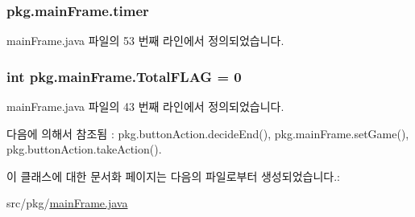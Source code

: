 \subsubsection[{\texorpdfstring{timer}{timer}}]{ pkg.\+main\+Frame.\+timer\hspace{0.3cm}{\ttfamily [private]}}\hypertarget{classpkg_1_1main_frame_aa204a940456c1c064259cafdd59434a6}{}\label{classpkg_1_1main_frame_aa204a940456c1c064259cafdd59434a6}


main\+Frame.\+java 파일의 53 번째 라인에서 정의되었습니다.

\subsubsection[{\texorpdfstring{Total\+F\+L\+AG}{TotalFLAG}}]{\setlength{\rightskip}{0pt plus 5cm}int pkg.\+main\+Frame.\+Total\+F\+L\+AG = 0\hspace{0.3cm}{\ttfamily [static]}}\hypertarget{classpkg_1_1main_frame_a05dfc088773f5e52294e2ca37cccbcf1}{}\label{classpkg_1_1main_frame_a05dfc088773f5e52294e2ca37cccbcf1}


main\+Frame.\+java 파일의 43 번째 라인에서 정의되었습니다.



다음에 의해서 참조됨 \+:  pkg.\+button\+Action.\+decide\+End(), pkg.\+main\+Frame.\+set\+Game(), pkg.\+button\+Action.\+take\+Action().



이 클래스에 대한 문서화 페이지는 다음의 파일로부터 생성되었습니다.\+:\begin{DoxyCompactItemize}
\item 
src/pkg/\hyperlink{main_frame_8java}{main\+Frame.\+java}\end{DoxyCompactItemize}

